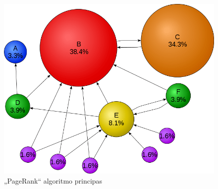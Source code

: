 \begin{figure}[htp!]
\centering
\includegraphics[scale=0.4]{img/pagerank.png}
\caption{„PageRank“ algoritmo principas \cite{PageRank}}
\label{fig:pagerank}
\end{figure}